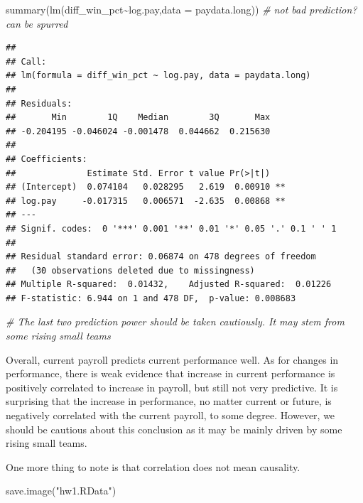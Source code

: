 \documentclass[
  12pt,
]{article}
\newenvironment{Shaded}{\begin{snugshade}}{\end{snugshade}}
\newcommand{\AttributeTok}[1]{\textcolor[rgb]{0.77,0.63,0.00}{#1}}
\newcommand{\CommentTok}[1]{\textcolor[rgb]{0.56,0.35,0.01}{\textit{#1}}}
\newcommand{\FunctionTok}[1]{\textcolor[rgb]{0.00,0.00,0.00}{#1}}
\newcommand{\NormalTok}[1]{#1}
\newcommand{\SpecialCharTok}[1]{\textcolor[rgb]{0.00,0.00,0.00}{#1}}
\newcommand{\StringTok}[1]{\textcolor[rgb]{0.31,0.60,0.02}{#1}}
\begin{document}
\begin{Shaded}
\begin{Highlighting}[]
\FunctionTok{summary}\NormalTok{(}\FunctionTok{lm}\NormalTok{(diff\_win\_pct}\SpecialCharTok{\textasciitilde{}}\NormalTok{log.pay,}\AttributeTok{data =}\NormalTok{ paydata.long)) }\CommentTok{\# not bad prediction? can be spurred}
\end{Highlighting}
\end{Shaded}

\begin{verbatim}
## 
## Call:
## lm(formula = diff_win_pct ~ log.pay, data = paydata.long)
## 
## Residuals:
##       Min        1Q    Median        3Q       Max 
## -0.204195 -0.046024 -0.001478  0.044662  0.215630 
## 
## Coefficients:
##              Estimate Std. Error t value Pr(>|t|)   
## (Intercept)  0.074104   0.028295   2.619  0.00910 **
## log.pay     -0.017315   0.006571  -2.635  0.00868 **
## ---
## Signif. codes:  0 '***' 0.001 '**' 0.01 '*' 0.05 '.' 0.1 ' ' 1
## 
## Residual standard error: 0.06874 on 478 degrees of freedom
##   (30 observations deleted due to missingness)
## Multiple R-squared:  0.01432,    Adjusted R-squared:  0.01226 
## F-statistic: 6.944 on 1 and 478 DF,  p-value: 0.008683
\end{verbatim}

\begin{Shaded}
\begin{Highlighting}[]
\CommentTok{\# The last two prediction power should be taken cautiously. It may stem from some rising small teams}
\end{Highlighting}
\end{Shaded}

Overall, current payroll predicts current performance well. As for
changes in performance, there is weak evidence that increase in current
performance is positively correlated to increase in payroll, but still
not very predictive. It is surprising that the increase in performance,
no matter current or future, is negatively correlated with the current
payroll, to some degree. However, we should be cautious about this
conclusion as it may be mainly driven by some rising small teams.

One more thing to note is that correlation does not mean causality.

\begin{Shaded}
\begin{Highlighting}[]
\FunctionTok{save.image}\NormalTok{(}\StringTok{"hw1.RData"}\NormalTok{)}
\end{Highlighting}
\end{Shaded}
\end{document}
